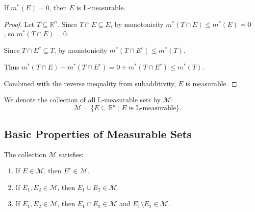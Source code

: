 \documentclass[11pt]{report}
\begin{document}
\begin{exbox}
If $m^*(E) = 0$, then $E$ is L-measurable.
\end{exbox}

\begin{proof}
Let $T \subseteq \mathbb{R}^n$. Since $T \cap E \subseteq E$, by monotonicity $m^*(T \cap E) \leq m^*(E) = 0$, so $m^*(T \cap E) = 0$.

Since $T \cap E^c \subseteq T$, by monotonicity $m^*(T \cap E^c) \leq m^*(T)$.

Thus $m^*(T \cap E) + m^*(T \cap E^c) = 0 + m^*(T \cap E^c) \leq m^*(T)$.

Combined with the reverse inequality from subadditivity, $E$ is measurable.
\end{proof}

\begin{defbox}
We denote the collection of all L-measurable sets by $\mathcal{M}$:
\[
\mathcal{M} = \{E \subseteq \mathbb{R}^n \mid E \text{ is L-measurable}\}.
\]
\end{defbox}

\subsection{Basic Properties of Measurable Sets}

\begin{thmbox}
The collection $\mathcal{M}$ satisfies:
\begin{enumerate}
    \item If $E \in \mathcal{M}$, then $E^c \in \mathcal{M}$.
    \item If $E_1, E_2 \in \mathcal{M}$, then $E_1 \cup E_2 \in \mathcal{M}$.
    \item If $E_1, E_2 \in \mathcal{M}$, then $E_1 \cap E_2 \in \mathcal{M}$ and $E_1 \setminus E_2 \in \mathcal{M}$.
\end{enumerate}
\end{thmbox}
\end{document}
